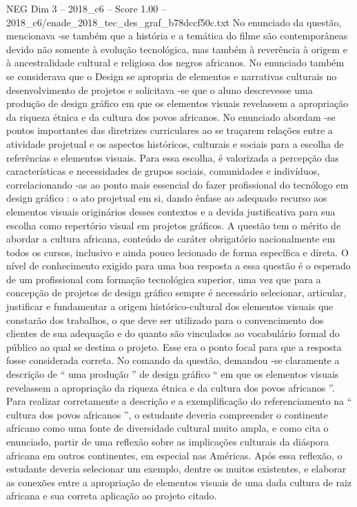 \begin{textsample}{NEG Dim 3 – 2018\_c6 – Score 1.00 – 2018\_c6/enade\_2018\_tec\_des\_graf\_b78dccf50c.txt}
No enunciado da questão, mencionava -se também que a história e a temática do filme são contemporâneas devido não somente à evolução tecnológica, mas também à reverência à origem e à ancestralidade cultural e religiosa dos negros africanos.
No enunciado também se considerava que o Design se apropria de elementos e narrativas culturais no desenvolvimento de projetos e solicitava -se que o aluno descrevesse uma produção de design gráfico em que os elementos visuais revelassem a apropriação da riqueza étnica e da cultura dos povos africanos.
No enunciado abordam -se pontos importantes das diretrizes curriculares ao se traçarem relações entre a atividade projetual e os aspectos históricos, culturais e sociais para a escolha de referências e elementos visuais.
Para essa escolha, é valorizada a percepção das características e necessidades de grupos sociais, comunidades e indivíduos, correlacionando -as ao ponto mais essencial do fazer profissional do tecnólogo em design gráfico : o ato projetual em si, dando ênfase ao adequado recurso aos elementos visuais originários desses contextos e a devida justificativa para sua escolha como repertório visual em projetos gráficos.
A questão tem o mérito de abordar a cultura africana, conteúdo de caráter obrigatório nacionalmente em todos os cursos, inclusivo e ainda pouco lecionado de forma específica e direta.
O nível de conhecimento exigido para uma boa resposta a essa questão é o esperado de um profissional com formação tecnológica superior, uma vez que para a concepção de projetos de design gráfico sempre é necessário selecionar, articular, justificar e fundamentar a origem histórico-cultural dos elementos visuais que constarão dos trabalhos, o que deve ser utilizado para o convencimento dos clientes de sua adequação e do quanto são vinculados ao vocabulário formal do público ao qual se destina o projeto.
Esse era o ponto focal para que a resposta fosse considerada correta.
No comando da questão, demandou -se claramente a descrição de “ uma produção ” de design gráfico “ em que os elementos visuais revelassem a apropriação da riqueza étnica e da cultura dos povos africanos ”.
Para realizar corretamente a descrição e a exemplificação do referenciamento na “ cultura dos povos africanos ”, o estudante deveria compreender o continente africano como uma fonte de diversidade cultural muito ampla, e como cita o enunciado, partir de uma reflexão sobre as implicações culturais da diáspora africana em outros continentes, em especial nas Américas.
Após essa reflexão, o estudante deveria selecionar um exemplo, dentre os muitos existentes, e elaborar as conexões entre a apropriação de elementos visuais de uma dada cultura de raiz africana e sua correta aplicação ao projeto citado.

\end{textsample}
